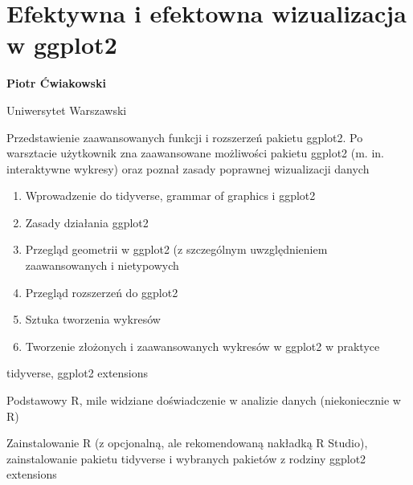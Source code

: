 \documentclass[\main/boa.tex]{subfiles}
\begin{document}
\section{Efektywna i efektowna wizualizacja w ggplot2}

\begin{minipage}{0.915\textwidth}
\centering
{\bf {} Piotr Ćwiakowski}
\end{minipage}

\vskip 0.3cm

\begin{affiliations}
\begin{minipage}{0.915\textwidth}
\centering
\large Uniwersytet Warszawski  \\[2pt]
\end{minipage}
\end{affiliations}

\vskip 0.8cm

\opiswarsztatu Przedstawienie zaawansowanych funkcji i rozszerzeń pakietu ggplot2. Po warsztacie użytkownik zna zaawansowane możliwości pakietu ggplot2 (m. in. interaktywne wykresy) oraz poznał zasady poprawnej wizualizacji danych

\planwarsztatu
\begin{enumerate}
\item Wprowadzenie do tidyverse, grammar of graphics i ggplot2
\item Zasady działania ggplot2
\item Przegląd geometrii w ggplot2 (z szczególnym uwzględnieniem zaawansowanych i nietypowych
\item Przegląd rozszerzeń do ggplot2
\item Sztuka tworzenia wykresów
\item Tworzenie złożonych i zaawansowanych wykresów w ggplot2 w praktyce
\end{enumerate}	 

\pakiety tidyverse, ggplot2 extensions

\umiejetnosci Podstawowy R, mile widziane doświadczenie w analizie danych (niekoniecznie w R)

\wymagania Zainstalowanie R (z opcjonalną, ale rekomendowaną nakładką R Studio), zainstalowanie pakietu tidyverse i wybranych pakietów z rodziny ggplot2 extensions
\end{document}
